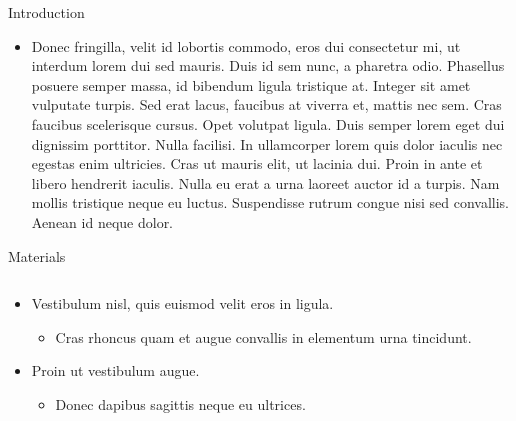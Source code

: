 \documentclass[final,hyperref={pdfpagelabels=false}]{beamer}
\begin{document}
\begin{frame}[t]
\begin{columns}[t]
\begin{column}{.32\textwidth}
\begin{block}{Introduction}
        \begin{itemize}
        \item Donec fringilla, velit id lobortis commodo, eros dui
          consectetur mi, ut interdum lorem dui sed mauris. Duis id
          sem nunc, a pharetra odio. Phasellus posuere \alert{semper
            massa}, id bibendum ligula tristique at. Integer sit amet
          vulputate turpis. Sed erat lacus, faucibus at viverra et,
          mattis nec sem. Cras faucibus \alert{scelerisque}
          cursus. Opet volutpat ligula. Duis semper lorem eget dui
          dignissim porttitor. Nulla facilisi. In ullamcorper lorem
          quis dolor iaculis nec egestas enim ultricies. Cras ut
          mauris elit, ut lacinia dui. Proin in ante et libero
          hendrerit iaculis. Nulla eu erat a urna laoreet auctor id a
          turpis. Nam mollis tristique neque eu luctus. Suspendisse
          rutrum congue nisi sed convallis. Aenean id neque dolor.
        \end{itemize}

      \end{block}


      \begin{block}{Materials}

        \begin{columns} %
          \begin{column}{.54\textwidth} %
            \begin{itemize}
            \item Vestibulum nisl, quis euismod velit eros in ligula.
              \begin{itemize}
              \item Cras rhoncus quam et augue convallis in elementum
                urna tincidunt.
              \end{itemize}
            \item Proin ut vestibulum augue.
              \begin{itemize}
              \item Donec dapibus sagittis neque eu ultrices.
              \end{itemize}
            \end{itemize}
          \end{column}


\end{columns}
\end{block}
\end{column}
\end{columns}
\end{frame}
\end{document}

